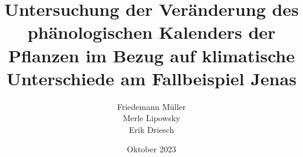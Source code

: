 \documentclass[12pt]{report}
\title{Untersuchung der Veränderung des phänologischen Kalenders der Pflanzen im Bezug auf klimatische Unterschiede am Fallbeispiel Jenas}
\institute{Staatliche Gemeinschaftsschule Kaleidoskop Jena}
\author{\Large Friedemann Müller \\ Merle Lipowsky \\ Erik Driesch}
\date{Oktober 2023}
\begin{document}
\setmainfont{Arial} %

\maketitle

\renewcommand{\contentsname}{Inhaltsverzeichnis}
\tableofcontents
\newpage









%
%
\end{document}
